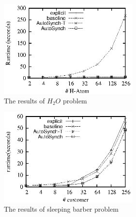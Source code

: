 \documentclass[preprint]{sigplanconf}
\begin{document}
\begin{figure}[ht!]
  \centering
  \includegraphics[width=70mm]{fig/h2o.eps}
  \caption{The results of $H_2O$ problem}
  \label{fig:h2o_eval}
\end{figure}

\begin{figure}[ht!]
  \centering
  \includegraphics[width=70mm]{fig/sb.eps}
  \caption{The results of sleeping barber problem}
  \label{fig:sb_eval}
\end{figure}
\end{document}
